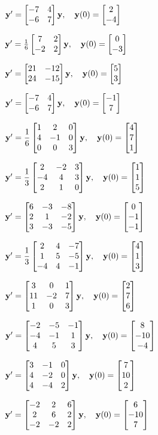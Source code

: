 \begin{exerciselist}

\item\label{exer:10.4.16}$\mathbf{y}'=\begin{bmatrix}-7&4\\-6&7\end{bmatrix}\mathbf{y},\quad\mathbf{y}(0)=\begin{bmatrix}2\\-4\end{bmatrix}$

\item\label{exer:10.4.17}$\mathbf{y}'=\frac{1}{6}\begin{bmatrix}7&2\\-2&2\end{bmatrix}\mathbf{y},\quad\mathbf{y}(0)=\begin{bmatrix}0\\-3\end{bmatrix}$

\item\label{exer:10.4.18}$\mathbf{y}'=\begin{bmatrix}21&-12\\24&-15\end{bmatrix}\mathbf{y},\quad\mathbf{y}(0)=\begin{bmatrix}5\\3\end{bmatrix}$

\item\label{exer:10.4.19}$\mathbf{y}'=\begin{bmatrix}-7&4\\-6&7\end{bmatrix}\mathbf{y},\quad\mathbf{y}(0)=\begin{bmatrix}-1\\7\end{bmatrix}$

\item\label{exer:10.4.20}$\mathbf{y}'=\dfrac{1}{6}\begin{bmatrix}1&2&0\\4&-1&0\\0&0&3\end{bmatrix}\mathbf{y},\quad\mathbf{y}(0)=\begin{bmatrix}4\\7\\1\end{bmatrix}$

\item\label{exer:10.4.21}$\mathbf{y}'=\dfrac{1}{3}\begin{bmatrix}2&-2&3\\-4&4&3\\2&1&0\end{bmatrix}\mathbf{y},\quad\mathbf{y}(0)=\begin{bmatrix}1\\1\\5\end{bmatrix}$

\item\label{exer:10.4.22}$\mathbf{y}'=\begin{bmatrix}6&-3&-8\\2&1&-2\\3&-3&-5\end{bmatrix}\mathbf{y},\quad\mathbf{y}(0)=\begin{bmatrix}0\\-1\\-1\end{bmatrix}$

\item\label{exer:10.4.23}$\mathbf{y}'=\dfrac{1}{3}\begin{bmatrix}2&4&-7\\1&5&-5\\-4&4&-1\end{bmatrix}\mathbf{y},\quad\mathbf{y}(0)=\begin{bmatrix}4\\1\\3\end{bmatrix}$

\item\label{exer:10.4.24}$\mathbf{y}'=\begin{bmatrix}3&0&1\\11&-2&7\\1&0&3\end{bmatrix}\mathbf{y},\quad
\mathbf{y}(0)=\begin{bmatrix}2\\7\\6\end{bmatrix}$

\item\label{exer:10.4.25}$\mathbf{y}'=\begin{bmatrix}-2&-5&-1\\-4&-1&1\\4&5&3\end{bmatrix}\mathbf{y},\quad
\mathbf{y}(0)=\begin{bmatrix}8\\-10\\-4\end{bmatrix}$

\item\label{exer:10.4.26}$\mathbf{y}'=\begin{bmatrix}3&-1&0\\4&-2&0\\4&-4&2\end{bmatrix}\mathbf{y},\quad
\mathbf{y}(0)=\begin{bmatrix}7\\10\\2\end{bmatrix}$

\item\label{exer:10.4.27}$\mathbf{y}'=
\begin{bmatrix}-2&2&6\\2&6&2\\-2&-2&2\end{bmatrix}\mathbf{y},\quad
\mathbf{y}(0)=\begin{bmatrix}6\\-10\\7\end{bmatrix}$


\end{exerciselist}
